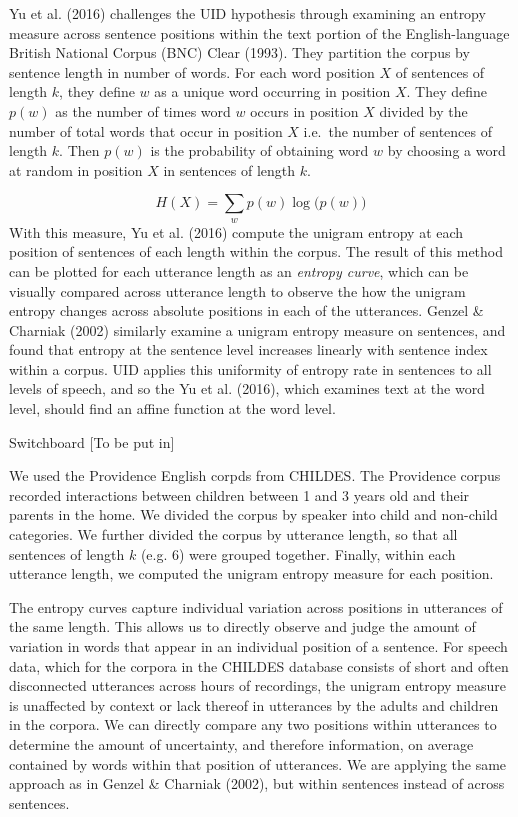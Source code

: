 \documentclass[10pt, letterpaper]{article}
\begin{document}
Yu et al. (2016) challenges the UID hypothesis through examining an
entropy measure across sentence positions within the text portion of the
English-language British National Corpus (BNC) Clear (1993). They
partition the corpus by sentence length in number of words. For each
word position \(X\) of sentences of length \(k\), they define \(w\) as a
unique word occurring in position \(X\). They define \(p(w)\) as the
number of times word \(w\) occurs in position \(X\) divided by the
number of total words that occur in position \(X\) i.e.~the number of
sentences of length \(k\). Then \(p(w)\) is the probability of obtaining
word \(w\) by choosing a word at random in position \(X\) in sentences
of length \(k\).

\[H(X) = \sum\limits_w p(w)\log\big(p(w)\big)\] With this measure, Yu et
al. (2016) compute the unigram entropy at each position of sentences of
each length within the corpus. The result of this method can be plotted
for each utterance length as an \emph{entropy curve}, which can be
visually compared across utterance length to observe the how the unigram
entropy changes across absolute positions in each of the utterances.
Genzel \& Charniak (2002) similarly examine a unigram entropy measure on
sentences, and found that entropy at the sentence level increases
linearly with sentence index within a corpus. UID applies this
uniformity of entropy rate in sentences to all levels of speech, and so
the Yu et al. (2016), which examines text at the word level, should find
an affine function at the word level.

Switchboard {[}To be put in{]}

We used the Providence English corpds from CHILDES. The Providence
corpus recorded interactions between children between 1 and 3 years old
and their parents in the home. We divided the corpus by speaker into
child and non-child categories. We further divided the corpus by
utterance length, so that all sentences of length \(k\) (e.g. \(6\))
were grouped together. Finally, within each utterance length, we
computed the unigram entropy measure for each position.

The entropy curves capture individual variation across positions in
utterances of the same length. This allows us to directly observe and
judge the amount of variation in words that appear in an individual
position of a sentence. For speech data, which for the corpora in the
CHILDES database consists of short and often disconnected utterances
across hours of recordings, the unigram entropy measure is unaffected by
context or lack thereof in utterances by the adults and children in the
corpora. We can directly compare any two positions within utterances to
determine the amount of uncertainty, and therefore information, on
average contained by words within that position of utterances. We are
applying the same approach as in Genzel \& Charniak (2002), but within
sentences instead of across sentences.
\end{document}
